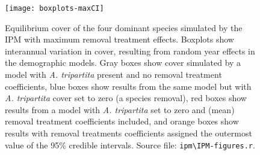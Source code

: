 \documentclass[11pt]{article}
\begin{document}
  \begin{figure}[tbp]
  \centering
  \texttt{[image: boxplots-maxCI]}
  \caption{Equilibrium cover of the four dominant species simulated by the IPM with maximum removal treatment effects. Boxplots show interannual variation in cover, 
  resulting from random year effects in the demographic models. Gray boxes show cover simulated by a model with \textit{A. tripartita} present and no removal treatment 
  coefficients, blue boxes show results from the same model but with \textit{A. tripartita} cover set to zero (a species removal), red boxes show results from a 
  model with  \textit{A. tripartita} set to zero and (mean) removal treatment coefficients included, and orange boxes show results with removal treatments 
  coefficients assigned the outermost value of the 95\% credible intervals.  Source file: \texttt{ipm\textbackslash IPM-figures.r}.}
  \label{fig:IPMresults-maxCI}
  \end{figure}
\end{document}
